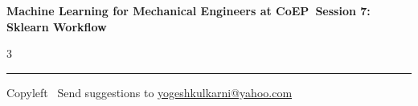 \documentclass[8pt,landscape]{article}
\begin{document}
\footnotesize

\begin{center}
\Large{\textbf{Machine Learning for Mechanical Engineers at CoEP\ Session 7: Sklearn Workflow}}
\end{center}

\begin{multicols}{3}

\end{multicols}

\rule{\linewidth}{0.25pt}
\scriptsize
Copyleft \textcopyleft\  Send suggestions to
\href{http://www.yogeshkulkarni.com}{yogeshkulkarni@yahoo.com}
\end{document}
